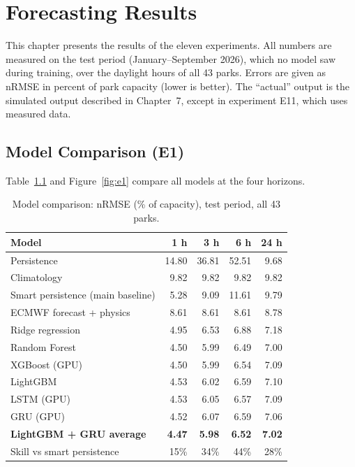 \documentclass[12pt]{report}
\begin{document}
\chapter{Forecasting Results}
This chapter presents the results of the eleven experiments. All numbers are measured on the test period (January--September 2026), which no model saw during training, over the daylight hours of all 43 parks. Errors are given as nRMSE in percent of park capacity (lower is better). The ``actual'' output is the simulated output described in Chapter~7, except in experiment E11, which uses measured data.

\section{Model Comparison (E1)}
\vspace{1mm}
Table~\ref{tab:e1} and Figure~\ref{fig:e1} compare all models at the four horizons.

\begin{table}[htbp]
\centering
\caption{Model comparison: nRMSE (\% of capacity), test period, all 43 parks.}
\label{tab:e1}
\begin{tabular}{lrrrr}
\toprule
Model & 1 h & 3 h & 6 h & 24 h \\
\midrule
Persistence & 14.80 & 36.81 & 52.51 & 9.68 \\
Climatology & 9.82 & 9.82 & 9.82 & 9.82 \\
Smart persistence (main baseline) & 5.28 & 9.09 & 11.61 & 9.79 \\
ECMWF forecast + physics & 8.61 & 8.61 & 8.61 & 8.78 \\
Ridge regression & 4.95 & 6.53 & 6.88 & 7.18 \\
Random Forest & 4.50 & 5.99 & 6.49 & 7.00 \\
XGBoost (GPU) & 4.50 & 5.99 & 6.54 & 7.09 \\
LightGBM & 4.53 & 6.02 & 6.59 & 7.10 \\
LSTM (GPU) & 4.53 & 6.05 & 6.57 & 7.09 \\
GRU (GPU) & 4.52 & 6.07 & 6.59 & 7.06 \\
\textbf{LightGBM + GRU average} & \textbf{4.47} & \textbf{5.98} & \textbf{6.52} & \textbf{7.02} \\
\midrule
Skill vs smart persistence & 15\% & 34\% & 44\% & 28\% \\
\bottomrule
\end{tabular}
\end{table}
\end{document}
